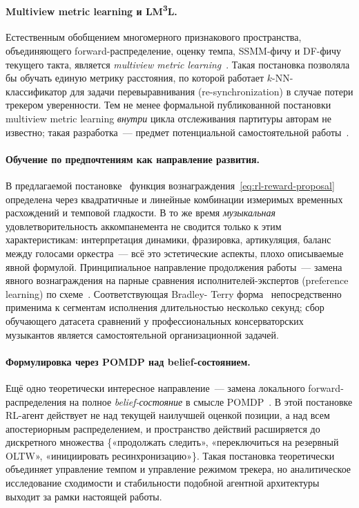 \paragraph*{Multiview metric learning и
LM\textsuperscript{3}L.} Естественным
обобщением многомерного признакового пространства, объединяющего
forward-распределение, оценку темпа, SSMM-фичу и DF-фичу
текущего такта, является \textit{multiview metric
learning}~\cite{HuLM3L2014,Bellet2014Metric}. Такая постановка
позволяла бы обучать единую метрику расстояния, по которой
работает $k$-NN-классификатор для задачи перевыравнивания
(re-synchronization) в случае потери трекером уверенности. Тем
не менее формальной публикованной постановки multiview metric
learning \textit{внутри} цикла отслеживания партитуры авторам
не известно; такая разработка~--- предмет потенциальной
самостоятельной работы~\cite{Johnston2020}.

\paragraph*{Обучение по предпочтениям как направление развития.}
В предлагаемой постановке~ функция
вознаграждения~\eqref{eq:rl-reward-proposal} определена через
квадратичные и линейные комбинации измеримых временных
расхождений и темповой гладкости. В то же время
\textit{музыкальная} удовлетворительность аккомпанемента не
сводится только к этим характеристикам: интерпретация
динамики, фразировка, артикуляция, баланс между голосами
оркестра~--- всё это эстетические аспекты, плохо описываемые
явной формулой. Принципиальное направление продолжения
работы~--- замена явного вознаграждения на парные сравнения
исполнителей-экспертов (preference learning) по
схеме~\cite{Christiano2017Preference}. Соответствующая Bradley-
Terry форма~ непосредственно применима к
сегментам исполнения длительностью несколько секунд; сбор
обучающего датасета сравнений у профессиональных
консерваторских музыкантов является самостоятельной
организационной задачей.

\paragraph*{Формулировка через POMDP над belief-состоянием.} Ещё
одно теоретически интересное направление~--- замена локального
forward-распределения на полное \textit{belief-состояние} в
смысле POMDP~\cite{Kaelbling1998POMDP}. В этой постановке
RL-агент действует не над текущей наилучшей оценкой позиции, а
над всем апостериорным распределением, и пространство действий
расширяется до дискретного множества \{«продолжать следить»,
«переключиться на резервный OLTW», «инициировать
ресинхронизацию»\}. Такая постановка теоретически объединяет
управление темпом и управление режимом трекера, но
аналитическое исследование сходимости и стабильности подобной
агентной архитектуры выходит за рамки настоящей работы.

